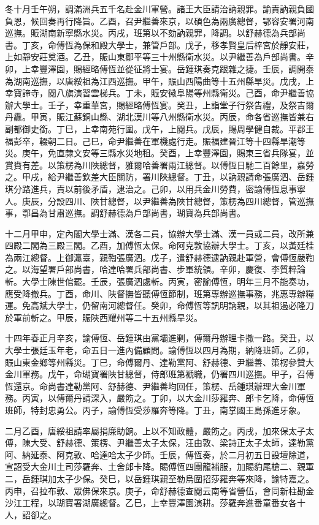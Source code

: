 \begin{pinyinscope}
冬十月壬午朔，調滿洲兵五千名赴金川軍營。諸王大臣請治訥親罪。諭責訥親負國負恩，候回奏再行降旨。乙酉，召尹繼善來京，以碩色為兩廣總督，鄂容安署河南巡撫。賑湖南新寧縣水災。丙戌，班第以不劾訥親罪，降調。以舒赫德為兵部尚書。丁亥，命傅恆為保和殿大學士，兼管戶部。戊子，移孝賢皇后梓宮於靜安莊，上如靜安莊奠酒。乙丑，賑山東鄒平等三十州縣衛水災。以尹繼善為戶部尚書。辛卯，上幸豐澤園，賜經略傅恆並從征將士宴。岳鍾琪奏克跟雜之捷。壬辰，調開泰為湖南巡撫，以唐綏祖為江西巡撫。甲午，賑山西陽曲等十五州縣旱災。戊戌，上幸寶諦寺，閱八旗演習雲梯兵。丁未，賑安徽阜陽等州縣衛災。己酉，命尹繼善協辦大學士。壬子，幸重華宮，賜經略傅恆宴。癸丑，上詣堂子行祭告禮，及祭吉爾丹纛。甲寅，賑江蘇銅山縣、湖北漢川等八州縣衛水災。丙辰，命各省巡撫皆兼右副都御史銜。丁巳，上幸南苑行圍。戊午，上閱兵。戊辰，賜周學健自裁。平郡王福彭卒，輟朝二日。己巳，命尹繼善在軍機處行走。賑福建晉江等十四縣旱潮等災。庚午，免直隸文安等三縣水災地租。癸酉，上幸豐澤園，賜東三省兵隊宴，並賞賚有差。以策楞為川陜總督，雅爾哈善署兩江總督。以傅恆日馳二百餘里，嘉勞之。甲戌，給尹繼善欽差大臣關防，署川陜總督。丁丑，以訥親請命張廣泗、岳鍾琪分路進兵，責以前後矛盾，逮治之。己卯，以用兵金川勞費，密諭傅恆息事寧人。庚辰，分設四川、陜甘總督，以尹繼善為陜甘總督，策楞為四川總督，管巡撫事，鄂昌為甘肅巡撫。調舒赫德為戶部尚書，瑚寶為兵部尚書。

十二月甲申，定內閣大學士滿、漢各二員，協辦大學士滿、漢一員或二員，改所兼四殿二閣為三殿三閣。乙酉，加傅恆太保。命阿克敦協辦大學士。丁亥，以黃廷桂為兩江總督。上御瀛臺，親鞫張廣泗。戊子，遣舒赫德逮訥親赴軍營，會傅恆嚴鞫之。以海望署戶部尚書，哈達哈署兵部尚書、步軍統領。辛卯，慶復、李質粹論斬。大學士陳世倌罷。壬辰，張廣泗處斬。丙寅，密諭傅恆，明年三月不能奏功，應受降撤兵。丁酉，命川、陜督撫皆聽傅恆節制，班第專辦巡撫事務，兆惠專辦糧運。免高斌大學士，仍留南河總督任。癸卯，命傅恆等訊明訥親，以其祖遏必隆刀於軍前斬之。甲辰，賑陜西耀州等二十五州縣旱災。

十四年春正月辛亥，諭傅恆、岳鍾琪由黨壩進剿，傅爾丹辦理卡撒一路。癸丑，以大學士張廷玉年老，命五日一進內備顧問。諭傅恆以四月為期，納降班師。乙卯，賑山東金鄉等州縣災。丁巳，命傅爾丹、達勒黨阿、舒赫德、尹繼善、策楞參贊大金川軍務。戊午，命瑚寶署陜甘總督，侍郎班第褫職，仍署四川巡撫。甲子，召傅恆還京。命尚書達勒黨阿、舒赫德、尹繼善均回任，策楞、岳鍾琪辦理大金川軍務。丙寅，以傅爾丹請深入，嚴飭之。丁卯，以大金川莎羅奔、郎卡乞降，命傅恆班師，特封忠勇公。丙子，諭傅恆受莎羅奔等降。丁丑，南掌國王島孫進牙象。

二月乙酉，唐綏祖請率屬捐廉助餉。上以不知政體，嚴飭之。丙戌，加來保太子太傅，陳大受、舒赫德、策楞、尹繼善太子太保，汪由敦、梁詩正太子太師，達勒黨阿、納延泰、阿克敦、哈達哈太子少師。壬辰，傅恆奏，於二月初五日設壇除道，宣詔受大金川土司莎羅奔、土舍郎卡降。賜傅恆四團龍補服，加賜豹尾槍二、親軍二，岳鍾琪加太子少保。癸巳，以岳鍾琪親至勒烏圍招莎羅奔等來降，諭特嘉之。丙申，召拉布敦、眾佛保來京。庚子，命舒赫德查閱云南等省營伍，會同新柱勘金沙江工程，以瑚寶署湖廣總督。乙巳，上幸豐澤園演耕。莎羅奔進番童番女各十人，詔卻之。


\end{pinyinscope}

